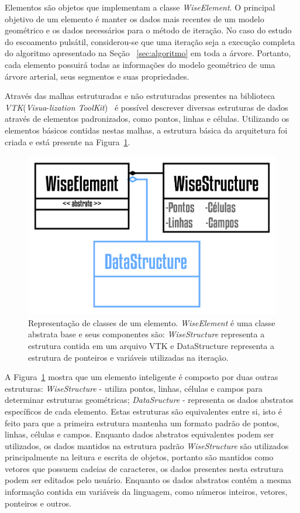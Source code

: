 Elementos são objetos que implementam a classe \textit{WiseElement}. O principal objetivo de um elemento é manter os dados mais recentes de um modelo geométrico e os dados necessários para o método de iteração. No caso do estudo do escoamento pulsátil, considerou-se que uma iteração seja a execução completa do algoritmo apresentado na Seção~ \ref{sec:algoritmo} em toda a árvore. Portanto, cada elemento possuirá todas as informações do modelo geométrico de uma árvore arterial, seus segmentos e suas propriedades.

Através das malhas estruturadas e não estruturadas presentes na biblioteca \textit{VTK}(\textit{Visua}-\textit{lization ToolKit})~\cite{VTKUSER} é possível descrever diversas estruturas de dados através de elementos padronizados, como pontos, linhas e células. Utilizando os elementos básicos contidas nestas malhas, a estrutura básica da arquitetura foi criada e está presente na Figura~\ref{fig2:wiselement}.

\begin{figure}[!htbp]
	\centering
	\includegraphics[scale=2]{Figures/WiseElement@16x.png}
	\caption{Representação de classes de um elemento. \textit{WiseElement} é uma classe abstrata base e seus componentes são: \textit{WiseStructure} representa a estrutura contida em um arquivo VTK e DataStructure representa a estrutura de ponteiros e variáveis utilizadas na iteração.}
	\label{fig2:wiselement}
\end{figure}

A Figura~\ref{fig2:wiselement} mostra que um elemento inteligente é composto por duas outras estruturas:  \textit{WiseStructure} - utiliza pontos, linhas, células e campos para determinar estruturas geométricas;  \textit{DataSructure} - representa os dados abstratos específicos de cada elemento. Estas estruturas são equivalentes entre si, isto é feito para que a primeira estrutura mantenha um formato padrão de pontos, linhas, células e campos. Enquanto dados abstratos equivalentes podem ser utilizados, os dados mantidos na estrutura padrão \textit{WiseStructure} são utilizados principalmente na leitura e escrita de objetos, portanto são mantidos como vetores que possuem cadeias de caracteres, os dados presentes nesta estrutura podem ser editados pelo usuário. Enquanto os dados abstratos contém a mesma informação contida em variáveis da linguagem, como números inteiros, vetores, ponteiros e outros.

